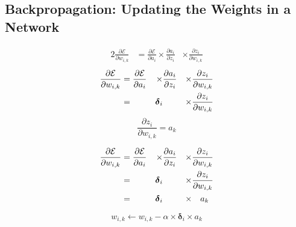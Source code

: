\documentclass[xcolor={table}]{beamer}
\begin{document}
\subsection{Backpropagation: Updating the Weights in a Network}

 \begin{frame} 
\begin{alignat}{2}
\frac{\partial \mathcal{E}}{\partial w_{i,k}} &= \frac{\partial \mathcal{E}}{\partial a_i} \times  \frac{\partial a_i}{\partial z_i} &\times \frac{\partial z_i}{\partial w_{i,k}}
\label{eq:chainerrorweight}
\end{alignat}
\begin{alignat}{5}
\frac{\partial \mathcal{E}}{\partial w_{i,k}} &= \frac{\partial \mathcal{E}}{\partial a_i} &\times&  \frac{\partial a_i}{\partial z_i} & \times &\frac{\partial z_i}{\partial w_{i,k}} \notag\\
&= &\boldsymbol{\delta}_i& & \times  &\frac{\partial z_i}{\partial w_{i,k}} \notag\\
\label{eq:chainsimplified}
\end{alignat}
\begin{equation}
\frac{\partial z_i}{\partial w_{i,k}} = a_k
\label{eq:zderivative}
\end{equation}
\end{frame} 



 \begin{frame} 
\begin{alignat}{5}
\frac{\partial \mathcal{E}}{\partial w_{i,k}} &= \frac{\partial \mathcal{E}}{\partial a_i} &\times&  \frac{\partial a_i}{\partial z_i} & \times &\frac{\partial z_i}{\partial w_{i,k}} \notag\\
&= &\boldsymbol{\delta}_i& & \times  &\frac{\partial z_i}{\partial w_{i,k}} \notag\\
&= &\boldsymbol{\delta}_i& & \times   &~~~a_k
\label{eq:chainfullysimplified}
\end{alignat}
\end{frame} 



 \begin{frame} 
\begin{equation}
w_{i,k}  \leftarrow w_{i,k} - \alpha \times \boldsymbol{\delta}_i \times  a_k
\label{eq:weightupdaterule}
\end{equation}
\end{frame} 
\end{document}
